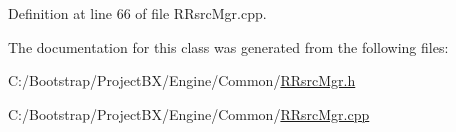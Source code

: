 Definition at line 66 of file RRsrcMgr.cpp.

The documentation for this class was generated from the following files:\begin{CompactItemize}
\item 
C:/Bootstrap/ProjectBX/Engine/Common/\hyperlink{_r_rsrc_mgr_8h}{RRsrcMgr.h}\item 
C:/Bootstrap/ProjectBX/Engine/Common/\hyperlink{_r_rsrc_mgr_8cpp}{RRsrcMgr.cpp}\end{CompactItemize}
